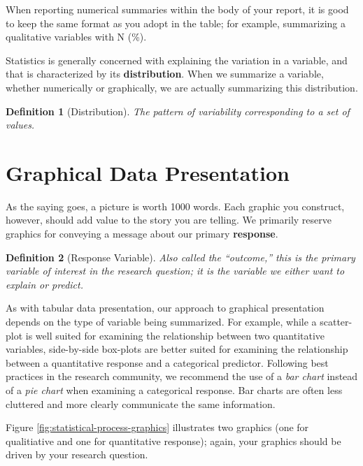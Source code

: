 \documentclass[
]{book}
\theoremstyle{plain}
\theoremstyle{mydefn}
\newtheorem{definition}{Definition}[chapter]
\theoremstyle{myexmpl}
\theoremstyle{remark}
\begin{document}
When reporting numerical summaries within the body of your report, it is good to keep the same format as you adopt in the table; for example, summarizing a qualitative variables with N (\%).

Statistics is generally concerned with explaining the variation in a variable, and that is characterized by its \textbf{distribution}. When we summarize a variable, whether numerically or graphically, we are actually summarizing this distribution.

\begin{definition}[Distribution]
\protect\hypertarget{def:defn-distribution}{}{\label{def:defn-distribution} {} }The pattern of variability corresponding to a set of values.
\end{definition}

\hypertarget{graphical-data-presentation}{%
\section{Graphical Data Presentation}\label{graphical-data-presentation}}

As the saying goes, a picture is worth 1000 words. Each graphic you construct, however, should add value to the story you are telling. We primarily reserve graphics for conveying a message about our primary \textbf{response}.

\begin{definition}[Response Variable]
\protect\hypertarget{def:defn-response}{}{\label{def:defn-response} {} }Also called the ``outcome,'' this is the primary variable of interest in the research question; it is the variable we either want to explain or predict.
\end{definition}

As with tabular data presentation, our approach to graphical presentation depends on the type of variable being summarized. For example, while a scatter-plot is well suited for examining the relationship between two quantitative variables, side-by-side box-plots are better suited for examining the relationship between a quantitative response and a categorical predictor. Following best practices in the research community, we recommend the use of a \emph{bar chart} instead of a \emph{pie chart} when examining a categorical response. Bar charts are often less cluttered and more clearly communicate the same information.

Figure \ref{fig:statistical-process-graphics} illustrates two graphics (one for qualitiative and one for quantitative response); again, your graphics should be driven by your research question.
\end{document}
